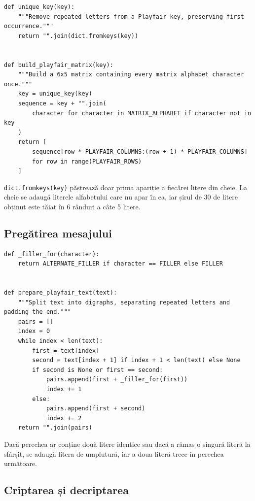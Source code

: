 \documentclass[12pt,a4paper]{article}
\begin{document}
\begin{lstlisting}[caption={Eliminarea literelor repetate din cheie și construirea matricei}]
def unique_key(key):
    """Remove repeated letters from a Playfair key, preserving first occurrence."""
    return "".join(dict.fromkeys(key))


def build_playfair_matrix(key):
    """Build a 6x5 matrix containing every matrix alphabet character once."""
    key = unique_key(key)
    sequence = key + "".join(
        character for character in MATRIX_ALPHABET if character not in key
    )
    return [
        sequence[row * PLAYFAIR_COLUMNS:(row + 1) * PLAYFAIR_COLUMNS]
        for row in range(PLAYFAIR_ROWS)
    ]
\end{lstlisting}

\texttt{dict.fromkeys(key)} păstrează doar prima apariție a fiecărei litere din cheie.
La cheie se adaugă literele alfabetului care nu apar în ea, iar șirul de 30 de
litere obținut este tăiat în 6 rânduri a câte 5 litere.

\subsection{Pregătirea mesajului}

\begin{lstlisting}[caption={Împărțirea în perechi și inserarea literelor de umplutură}]
def _filler_for(character):
    return ALTERNATE_FILLER if character == FILLER else FILLER


def prepare_playfair_text(text):
    """Split text into digraphs, separating repeated letters and padding the end."""
    pairs = []
    index = 0
    while index < len(text):
        first = text[index]
        second = text[index + 1] if index + 1 < len(text) else None
        if second is None or first == second:
            pairs.append(first + _filler_for(first))
            index += 1
        else:
            pairs.append(first + second)
            index += 2
    return "".join(pairs)
\end{lstlisting}

Dacă perechea ar conține două litere identice sau dacă a rămas o singură literă la
sfârșit, se adaugă litera de umplutură, iar a doua literă trece în perechea următoare.

\subsection{Criptarea și decriptarea}
\end{document}
